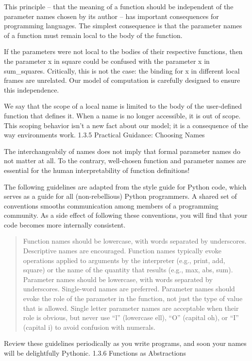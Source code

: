 \documentclass[letterpaper,10pt,dvipdfmx]{sphinxmanual}
\begin{document}
This principle -- that the meaning of a function should be independent of the parameter names chosen by its author -- has important consequences for programming languages. The simplest consequence is that the parameter names of a function must remain local to the body of the function.

If the parameters were not local to the bodies of their respective functions, then the parameter x in square could be confused with the parameter x in sum\_squares. Critically, this is not the case: the binding for x in different local frames are unrelated. Our model of computation is carefully designed to ensure this independence.

We say that the scope of a local name is limited to the body of the user-defined function that defines it. When a name is no longer accessible, it is out of scope. This scoping behavior isn't a new fact about our model; it is a consequence of the way environments work.
1.3.5   Practical Guidance: Choosing Names

The interchangeabily of names does not imply that formal parameter names do not matter at all. To the contrary, well-chosen function and parameter names are essential for the human interpretability of function definitions!

The following guidelines are adapted from the style guide for Python code, which serves as a guide for all (non-rebellious) Python programmers. A shared set of conventions smooths communication among members of a programming community. As a side effect of following these conventions, you will find that your code becomes more internally consistent.
\begin{quote}

Function names should be lowercase, with words separated by underscores. Descriptive names are encouraged.
Function names typically evoke operations applied to arguments by the interpreter (e.g., print, add, square) or the name of the quantity that results (e.g., max, abs, sum).
Parameter names should be lowercase, with words separated by underscores. Single-word names are preferred.
Parameter names should evoke the role of the parameter in the function, not just the type of value that is allowed.
Single letter parameter names are acceptable when their role is obvious, but never use ``l'' (lowercase ell), ``O'' (capital oh), or ``I'' (capital i) to avoid confusion with numerals.
\end{quote}

Review these guidelines periodically as you write programs, and soon your names will be delightfully Pythonic.
1.3.6   Functions as Abstractions
\end{document}
